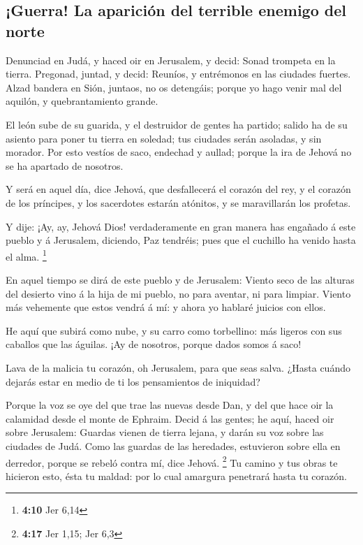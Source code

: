 \hypertarget{guerra-la-apariciuxf3n-del-terrible-enemigo-del-norte}{%
\subsection{¡Guerra! La aparición del terrible enemigo del
norte}\label{guerra-la-apariciuxf3n-del-terrible-enemigo-del-norte}}

 Denunciad en Judá, y haced oir en Jerusalem, y decid:
Sonad trompeta en la tierra. Pregonad, juntad, y decid: Reuníos, y
entrémonos en las ciudades fuertes.  Alzad bandera en
Sión, juntaos, no os detengáis; porque yo hago venir mal del aquilón, y
quebrantamiento grande.

 El león sube de su guarida, y el destruidor de gentes ha
partido; salido ha de su asiento para poner tu tierra en soledad; tus
ciudades serán asoladas, y sin morador.  Por esto vestíos
de saco, endechad y aullad; porque la ira de Jehová no se ha apartado de
nosotros.

 Y será en aquel día, dice Jehová, que desfallecerá el
corazón del rey, y el corazón de los príncipes, y los sacerdotes estarán
atónitos, y se maravillarán los profetas.

 Y dije: ¡Ay, ay, Jehová Dios! verdaderamente en gran
manera has engañado á este pueblo y á Jerusalem, diciendo, Paz tendréis;
pues que el cuchillo ha venido hasta el alma. \footnote{\textbf{4:10}
  Jer 6,14}

 En aquel tiempo se dirá de este pueblo y de Jerusalem:
Viento seco de las alturas del desierto vino á la hija de mi pueblo, no
para aventar, ni para limpiar.  Viento más vehemente que
estos vendrá á mí: y ahora yo hablaré juicios con ellos.

 He aquí que subirá como nube, y su carro como
torbellino: más ligeros con sus caballos que las águilas. ¡Ay de
nosotros, porque dados somos á saco!

 Lava de la malicia tu corazón, oh Jerusalem, para que
seas salva. ¿Hasta cuándo dejarás estar en medio de ti los pensamientos
de iniquidad?

 Porque la voz se oye del que trae las nuevas desde Dan,
y del que hace oir la calamidad desde el monte de Ephraim.
 Decid á las gentes; he aquí, haced oir sobre Jerusalem:
Guardas vienen de tierra lejana, y darán su voz sobre las ciudades de
Judá.  Como las guardas de las heredades, estuvieron
sobre ella en derredor, porque se rebeló contra mí, dice Jehová.
\footnote{\textbf{4:17} Jer 1,15; Jer 6,3}  Tu camino y
tus obras te hicieron esto, ésta tu maldad: por lo cual amargura
penetrará hasta tu corazón.

